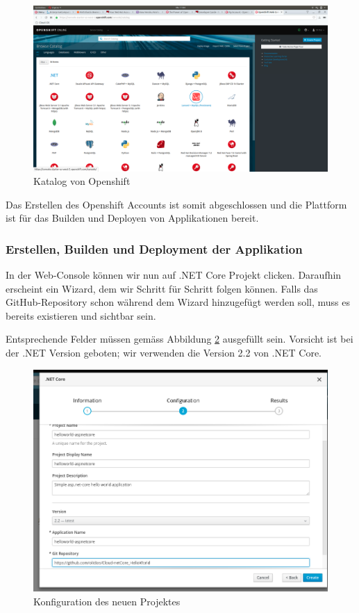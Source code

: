 \documentclass[12pt,a4paper]{article}
\begin{document}
\begin{figure}[h]
	\centering
	\includegraphics[width=0.7\linewidth]{img/os-overview-catalog}
	\caption{Katalog von Openshift}
	\label{fig:os-overview-catalog}
\end{figure}
Das Erstellen des Openshift Accounts ist somit abgeschlossen und die Plattform ist für das Builden und Deployen von Applikationen bereit. 
\subsubsection{Erstellen, Builden und Deployment der Applikation}
In der Web-Console können wir nun auf .NET Core Projekt clicken. Daraufhin erscheint ein Wizard, dem wir Schritt für Schritt folgen können. Falls das GitHub-Repository schon während dem Wizard hinzugefügt werden soll, muss es bereits existieren und sichtbar sein. 

Entsprechende Felder müssen gemäss Abbildung \ref{fig:os-new-config} ausgefüllt sein. Vorsicht ist bei der .NET Version geboten; wir verwenden die Version 2.2 von .NET Core. 
\begin{figure}[h]
	\centering
	\includegraphics[width=0.7\linewidth]{img/os-new-config}
	\caption{Konfiguration des neuen Projektes}
	\label{fig:os-new-config}
\end{figure}
\end{document}
